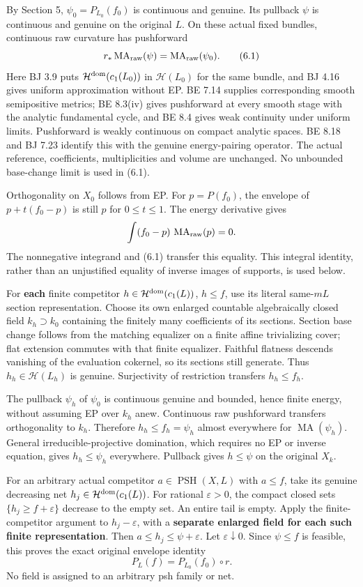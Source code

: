 \documentclass[
  10pt,
]{article}
\begin{document}
By Section 5, \(\psi_0=P_{L_0}(f_0)\) is continuous and genuine. Its
pullback \(\psi\) is continuous and genuine on the original \(L\). On
these actual fixed bundles, continuous raw curvature has pushforward
\[r_*\operatorname{MA}_{\rm raw}(\psi)=\operatorname{MA}_{\rm raw}(\psi_0). \tag{6.1}\]
Here BJ 3.9 puts \(\mathcal H^{\rm dom}(c_1(L_0))\) in
\(\mathcal H(L_0)\) for the same bundle, and BJ 4.16 gives uniform
approximation without EP. BE 7.14 supplies corresponding smooth
semipositive metrics; BE 8.3(iv) gives pushforward at every smooth stage
with the analytic fundamental cycle, and BE 8.4 gives weak continuity
under uniform limits. Pushforward is weakly continuous on compact
analytic spaces. BE 8.18 and BJ 7.23 identify this with the genuine
energy-pairing operator. The actual reference, coefficients,
multiplicities and volume are unchanged. No unbounded base-change limit
is used in (6.1).

Orthogonality on \(X_0\) follows from EP. For \(p=P(f_0)\), the envelope
of \(p+t(f_0-p)\) is still \(p\) for \(0\le t\le1\). The energy
derivative gives \[\int(f_0-p)\,\operatorname{MA}_{\rm raw}(p)=0.\] The
nonnegative integrand and (6.1) transfer this equality. This integral
identity, rather than an unjustified equality of inverse images of
supports, is used below.

For \textbf{each} finite competitor
\(h\in\mathcal H^{\rm dom}(c_1(L))\), \(h\le f\), use its literal
same-\(mL\) section representation. Choose its own enlarged countable
algebraically closed field \(k_h\supset k_0\) containing the finitely
many coefficients of its sections. Section base change follows from the
matching equalizer on a finite affine trivializing cover; flat extension
commutes with that finite equalizer. Faithful flatness descends
vanishing of the evaluation cokernel, so its sections still generate.
Thus \(h_h\in\mathcal H(L_h)\) is genuine. Surjectivity of restriction
transfers \(h_h\le f_h\).

The pullback \(\psi_h\) of \(\psi_0\) is continuous genuine and bounded,
hence finite energy, without assuming EP over \(k_h\) anew. Continuous
raw pushforward transfers orthogonality to \(k_h\). Therefore
\(h_h\le f_h=\psi_h\) almost everywhere for
\(\operatorname{MA}(\psi_h)\). General irreducible-projective
domination, which requires no EP or inverse equation, gives
\(h_h\le\psi_h\) everywhere. Pullback gives \(h\le\psi\) on the original
\(X_k\).

For an arbitrary actual competitor \(a\in\operatorname{PSH}(X,L)\) with
\(a\le f\), take its genuine decreasing net
\(h_j\in\mathcal H^{\rm dom}(c_1(L))\). For rational \(\varepsilon>0\),
the compact closed sets \(\{h_j\ge f+\varepsilon\}\) decrease to the
empty set. An entire tail is empty. Apply the finite-competitor argument
to \(h_j-\varepsilon\), with a \textbf{separate enlarged field for each
such finite representation}. Then \(a\le h_j\le\psi+\varepsilon\). Let
\(\varepsilon\downarrow0\). Since \(\psi\le f\) is feasible, this proves
the exact original envelope identity \[P_L(f)=P_{L_0}(f_0)\circ r.\] No
field is assigned to an arbitrary psh family or net.
\end{document}
